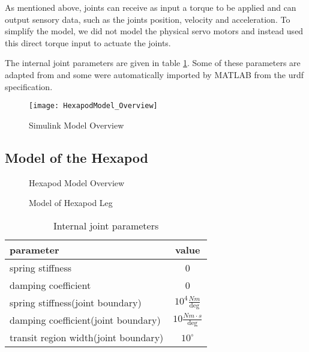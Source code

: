 As mentioned above, joints can receive as input a torque to be applied and can output sensory data, such as the joints position, velocity and acceleration. 
To simplify the model, we did not model the physical servo motors and instead used this direct torque input to actuate the joints.

The internal joint parameters are given in table \ref{table: Joint parameters}.
Some of these parameters are adapted from \parencite{FIND AUTHOR} and some were automatically imported by MATLAB from the urdf specification.


\begin{figure}
	\centerline{\texttt{[image: HexapodModel\_Overview]}}
	\caption{Simulink Model Overview}
	\label{figure: Simulink Model Overview}
\end{figure}

\subsection{Model of the Hexapod}

\begin{figure}
	\centerline{}
	\caption{Hexapod Model Overview}
	\label{figure: Hexapod Model Overview}
\end{figure}

\begin{figure}
	\centerline{}
	\caption{Model of Hexapod Leg}
	\label{figure: Hexapod Leg}
\end{figure}



\begin{table}
	\centering
	\begin{tabular}{| l | c |}
		\hline
		\textbf{parameter} & \textbf{value} \\
		\hline
		spring stiffness & 0 \\
		\hline
		damping coefficient & 0 \\
		\hline
		spring stiffness(joint boundary) & $10^4 \frac{Nm}{\text{deg}}$ \\
		\hline
		damping coefficient(joint boundary) &  $10 \frac{Nm \cdot s}{\text{deg}}$\\
		\hline
		transit region width(joint boundary) &  $10^{\circ}$\\
		\hline
	\end{tabular}
	\caption{Internal joint parameters}
	\label{table: Joint parameters}
\end{table}


